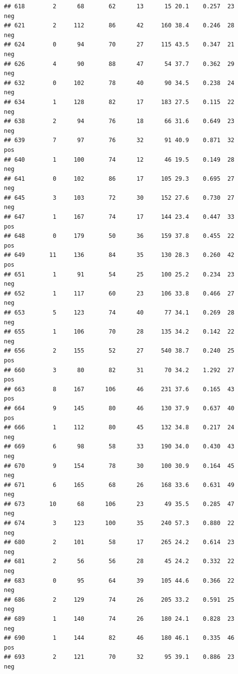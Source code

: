 \documentclass[
]{article}
\begin{document}
\begin{verbatim}
## 618        2      68       62      13      15 20.1    0.257  23      neg
## 621        2     112       86      42     160 38.4    0.246  28      neg
## 624        0      94       70      27     115 43.5    0.347  21      neg
## 626        4      90       88      47      54 37.7    0.362  29      neg
## 632        0     102       78      40      90 34.5    0.238  24      neg
## 634        1     128       82      17     183 27.5    0.115  22      neg
## 638        2      94       76      18      66 31.6    0.649  23      neg
## 639        7      97       76      32      91 40.9    0.871  32      pos
## 640        1     100       74      12      46 19.5    0.149  28      neg
## 641        0     102       86      17     105 29.3    0.695  27      neg
## 645        3     103       72      30     152 27.6    0.730  27      neg
## 647        1     167       74      17     144 23.4    0.447  33      pos
## 648        0     179       50      36     159 37.8    0.455  22      pos
## 649       11     136       84      35     130 28.3    0.260  42      pos
## 651        1      91       54      25     100 25.2    0.234  23      neg
## 652        1     117       60      23     106 33.8    0.466  27      neg
## 653        5     123       74      40      77 34.1    0.269  28      neg
## 655        1     106       70      28     135 34.2    0.142  22      neg
## 656        2     155       52      27     540 38.7    0.240  25      pos
## 660        3      80       82      31      70 34.2    1.292  27      pos
## 663        8     167      106      46     231 37.6    0.165  43      pos
## 664        9     145       80      46     130 37.9    0.637  40      pos
## 666        1     112       80      45     132 34.8    0.217  24      neg
## 669        6      98       58      33     190 34.0    0.430  43      neg
## 670        9     154       78      30     100 30.9    0.164  45      neg
## 671        6     165       68      26     168 33.6    0.631  49      neg
## 673       10      68      106      23      49 35.5    0.285  47      neg
## 674        3     123      100      35     240 57.3    0.880  22      neg
## 680        2     101       58      17     265 24.2    0.614  23      neg
## 681        2      56       56      28      45 24.2    0.332  22      neg
## 683        0      95       64      39     105 44.6    0.366  22      neg
## 686        2     129       74      26     205 33.2    0.591  25      neg
## 689        1     140       74      26     180 24.1    0.828  23      neg
## 690        1     144       82      46     180 46.1    0.335  46      pos
## 693        2     121       70      32      95 39.1    0.886  23      neg

\end{verbatim}
\end{document}
